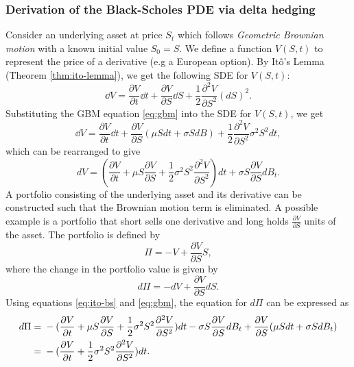 \subsubsection{Derivation of the Black-Scholes PDE via delta hedging} \label{sec:bse-derivation}
Consider an underlying asset at price $S_t$ which follows \textit{Geometric Brownian motion} with a known initial value $S_0 = S$.
We define a function $V(S,t)$ to represent the price of a derivative (e.g a European option). By It\^{o}'s Lemma (Theorem \ref{thm:ito-lemma}), we
get the following SDE for $V(S,t)$:
\begin{equation}
    \dd V = \frac{\partial V}{\partial t} \dd t + \frac{\partial V}{\partial S} \dd S + \frac{1}{2} \frac{\partial^2 V}{\partial S^2} (dS)^2.
\end{equation}
Substituting the GBM equation \eqref{eq:gbm} into the SDE for $V(S,t)$, we get
\begin{equation}
    \dd V = \frac{\partial V}{\partial t} \dd t + \frac{\partial V}{\partial S} (\mu S dt + \sigma S dB) + \frac{1}{2} \frac{\partial^2 V}{\partial S^2} \sigma^2 S^2 dt,
\end{equation}
which can be rearranged to give
\begin{equation}
    dV = \left( \frac{\partial V}{\partial t} + \mu S \frac{\partial V}{\partial S} + \frac{1}{2} \sigma^2 S^2 \frac{\partial^2 V}{\partial S^2} \right) dt + \sigma S \frac{\partial V}{\partial S} dB_t. \label{eq:ito-bs}
\end{equation}
A portfolio consisting of the underlying asset and its derivative can be constructed such that the Brownian motion term is eliminated. A possible example\cite{hull_2021_options} is 
a portfolio that short sells one derivative and long holds $\frac{\partial V}{\partial S}$ units of the asset. The portfolio is defined by
\begin{equation}
    \Pi = -V + \frac{\partial V}{\partial S} S, \label{eq:portfolio}
\end{equation} 
where the change in the portfolio value is given by
\begin{equation}
    d\Pi = -dV + \frac{\partial V}{\partial S} dS.
\end{equation}
Using equations \eqref{eq:ito-bs} and \eqref{eq:gbm}, the equation for $d\Pi$ can be expressed as
\begin{align}
    d\Pi 
    {}={}& -(\frac{\partial V}{\partial t} + \mu S \frac{\partial V}{\partial S} + \frac{1}{2} \sigma^2 S^2 \frac{\partial^2 V}{\partial S^2}) dt - \sigma S \frac{\partial V}{\partial S} dB_t + \frac{\partial V}{\partial S}( \mu S dt + \sigma S dB_t) \notag\\
    {}={}& -(\frac{\partial V}{\partial t} + \frac{1}{2} \sigma^2 S^2 \frac{\partial^2 V}{\partial S^2}) dt. \label{eq:change-in-portfolio}
\end{align}
